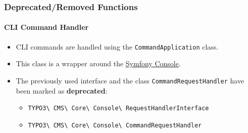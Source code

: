 
\begin{frame}[fragile]
	\frametitle{Deprecated/Removed Functions}
	\framesubtitle{CLI Command Handler}

	\begin{itemize}
		\item CLI commands are handled using the \texttt{CommandApplication} class.
		\item This class is a wrapper around the
			\href{https://symfony.com/doc/current/components/console.html}{Symfony Console}.

		\item The previously used interface and the class \texttt{CommandRequestHandler} have been marked as \textbf{deprecated}:

			\begin{itemize}
				\item
					\texttt{TYPO3\textbackslash
						CMS\textbackslash
						Core\textbackslash
						Console\textbackslash
						RequestHandlerInterface}
				\item
					\texttt{TYPO3\textbackslash
						CMS\textbackslash
						Core\textbackslash
						Console\textbackslash
						CommandRequestHandler}
			\end{itemize}

	\end{itemize}

\end{frame}



